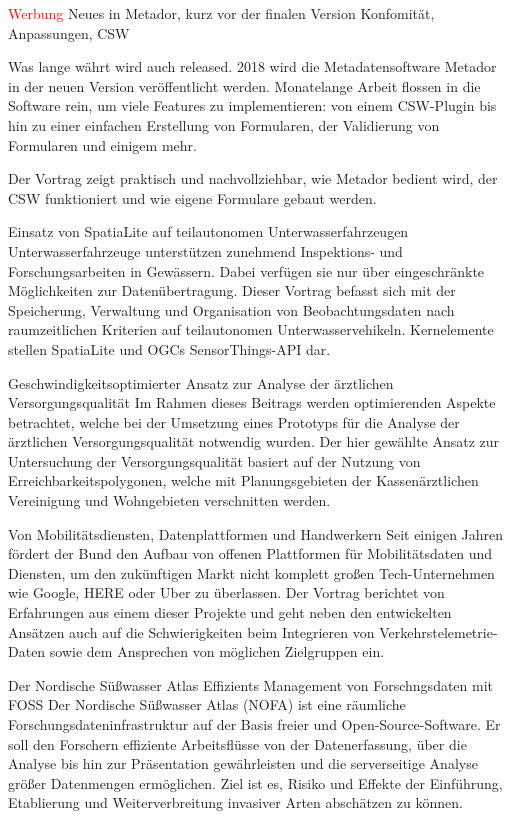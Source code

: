 \renewcommand{\conferenceDay}{\freitag}
\textcolor{red}{Werbung}
\newpage
{}
%
{Neues in Metador, kurz vor der finalen Version}%
{Konfomität, Anpassungen, CSW}%
{%
Was lange währt wird auch released. 2018 wird die Metadatensoftware Metador
in der neuen Version veröffentlicht werden. Monatelange Arbeit flossen in
die Software rein, um viele Features zu implementieren: von einem CSW-Plugin
bis hin zu einer einfachen Erstellung von Formularen, der Validierung von
Formularen und einigem mehr.

Der Vortrag zeigt praktisch und nachvollziehbar, wie Metador bedient wird,
der CSW funktioniert und wie eigene Formulare gebaut werden.%
}

%
{Einsatz von SpatiaLite auf teilautonomen Unterwasserfahrzeugen}%
{}%
{%
Unterwasserfahrzeuge unterstützen zunehmend Inspektions- und Forschungsarbeiten
in Gewässern. Dabei verfügen sie nur über eingeschränkte Möglichkeiten zur
Datenübertragung. Dieser Vortrag befasst sich mit der Speicherung, Verwaltung
und Organisation von Beobachtungsdaten nach raumzeitlichen Kriterien auf
teilautonomen Unterwasservehikeln. Kernelemente stellen SpatiaLite und OGCs
SensorThings-API dar.%
}

%
{Geschwindigkeitsoptimierter Ansatz zur Analyse der ärztlichen Versorgungsqualität}%
{}%
{%
Im Rahmen dieses Beitrags werden optimierenden Aspekte betrachtet, welche bei
der Umsetzung eines Prototyps für die Analyse der ärztlichen
Versorgungsqualität notwendig wurden. Der hier gewählte Ansatz zur Untersuchung
der Versorgungsqualität basiert auf der Nutzung von Erreichbarkeitspolygonen,
welche mit Planungsgebieten der Kassenärztlichen Vereinigung und Wohngebieten
verschnitten werden.%
}

%
{Von Mobilitätsdiensten, Datenplattformen und Handwerkern}%
{}%
{%
Seit einigen Jahren fördert der Bund den Aufbau von offenen Plattformen für
Mobilitätsdaten und Diensten, um den zukünftigen Markt nicht komplett großen
Tech-Unternehmen wie Google, HERE oder Uber zu überlassen. Der Vortrag
berichtet von Erfahrungen aus einem dieser Projekte und geht neben den
entwickelten Ansätzen auch auf die Schwierigkeiten beim Integrieren von
Verkehrstelemetrie-Daten sowie dem Ansprechen von möglichen Zielgruppen ein.%
}

%
{Der Nordische Süßwasser Atlas}%
{Effizients Management von Forschngsdaten mit FOSS}%
{%
Der Nordische Süßwasser Atlas (NOFA) ist eine räumliche
Forschungsdateninfrastruktur auf der Basis freier und Open-Source-Software.
Er soll den Forschern effiziente Arbeitsflüsse von der Datenerfassung, über
die Analyse bis hin zur Präsentation gewährleisten und die serverseitige
Analyse größer Datenmengen ermöglichen. Ziel ist es, Risiko und Effekte der
Einführung, Etablierung und Weiterverbreitung invasiver Arten abschätzen zu
können.%
}

